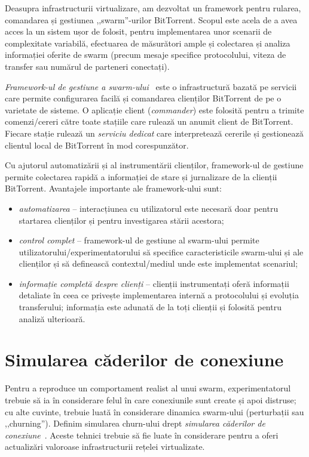 Deasupra infrastructurii virtualizare, am dezvoltat un framework pentru
rularea, comandarea și gestiunea ,,swarm''-urilor BitTorrent. Scopul
este acela de a avea acces la un sistem ușor de folosit, pentru implementarea
unor scenarii de complexitate variabilă, efectuarea de măsurători ample și
colectarea și analiza informației oferite de swarm (precum mesaje specifice
protocolului, viteza de transfer sau numărul de parteneri conectați).

\textit{Framework-ul de gestiune a swarm-ului}~\cite{swarm-management}
este o infrastructură bazată pe servicii care permite configurarea facilă
și comandarea clienților BitTorrent de pe o varietate de sisteme. O aplicație
client (\textit{commander}) este folosită pentru a trimite comenzi/cereri
către toate stațiile care rulează un anumit client de BitTorrent. Fiecare
stație rulează un \textit{serviciu dedicat} care interpretează cererile
și gestionează clientul local de BitTorrent în mod corespunzător.

Cu ajutorul automatizării și al instrumentării clienților, framework-ul
de gestiune permite colectarea rapidă a informației de stare și jurnalizare
de la clienții BitTorrent. Avantajele importante ale framework-ului sunt:

\begin{itemize}
  \item \textit{automatizarea} -- interacțiunea cu utilizatorul este
  necesară doar pentru startarea clienților și pentru investigarea stării
  acestora;
  \item \textit{control complet} -- framework-ul de gestiune al swarm-ului
  permite utilizatorului/experimentatorului să specifice caracteristicile
  swarm-ului și ale clienților și să definească contextul/mediul unde
  este implementat scenariul;
  \item \textit{informație completă despre clienți} -- clienții instrumentați
  oferă informații detaliate în ceea ce privește implementarea internă a
  protocolului și evoluția transferului; informația este adunată de la
  toți clienții și folosită pentru analiză ulterioară.
\end{itemize}

\section{Simularea căderilor de conexiune}
\label{sec:virt-infra:dropouts}

Pentru a reproduce un comportament realist al unui swarm, experimentatorul
trebuie să ia în considerare felul în care conexiunile sunt create și
apoi distruse; cu alte cuvinte, trebuie luată în considerare dinamica
swarm-ului (perturbații sau ,,churning''). Definim simularea churn-ului
drept \textit{simularea căderilor de conexiune}~\cite{simulating-dropouts}.
Aceste tehnici trebuie să fie luate în considerare pentru a oferi actualizări
valoroase infrastructurii rețelei virtualizate.

